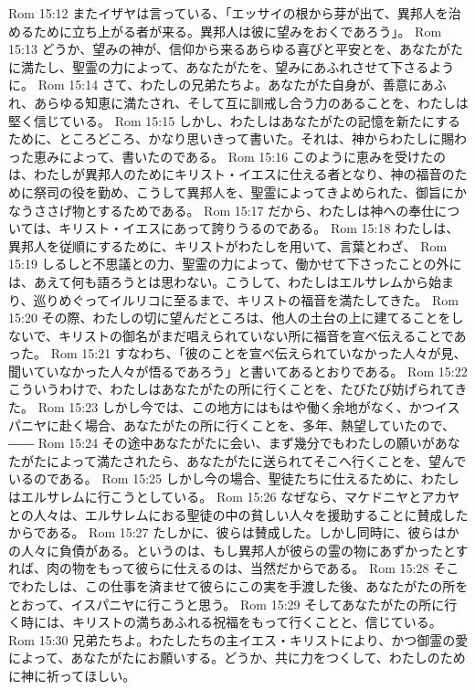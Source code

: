 Rom 15:12  またイザヤは言っている、「エッサイの根から芽が出て、異邦人を治めるために立ち上がる者が来る。異邦人は彼に望みをおくであろう」。
Rom 15:13  どうか、望みの神が、信仰から来るあらゆる喜びと平安とを、あなたがたに満たし、聖霊の力によって、あなたがたを、望みにあふれさせて下さるように。
Rom 15:14  さて、わたしの兄弟たちよ。あなたがた自身が、善意にあふれ、あらゆる知恵に満たされ、そして互に訓戒し合う力のあることを、わたしは堅く信じている。
Rom 15:15  しかし、わたしはあなたがたの記憶を新たにするために、ところどころ、かなり思いきって書いた。それは、神からわたしに賜わった恵みによって、書いたのである。
Rom 15:16  このように恵みを受けたのは、わたしが異邦人のためにキリスト・イエスに仕える者となり、神の福音のために祭司の役を勤め、こうして異邦人を、聖霊によってきよめられた、御旨にかなうささげ物とするためである。
Rom 15:17  だから、わたしは神への奉仕については、キリスト・イエスにあって誇りうるのである。
Rom 15:18  わたしは、異邦人を従順にするために、キリストがわたしを用いて、言葉とわざ、
Rom 15:19  しるしと不思議との力、聖霊の力によって、働かせて下さったことの外には、あえて何も語ろうとは思わない。こうして、わたしはエルサレムから始まり、巡りめぐってイルリコに至るまで、キリストの福音を満たしてきた。
Rom 15:20  その際、わたしの切に望んだところは、他人の土台の上に建てることをしないで、キリストの御名がまだ唱えられていない所に福音を宣べ伝えることであった。
Rom 15:21  すなわち、「彼のことを宣べ伝えられていなかった人々が見、聞いていなかった人々が悟るであろう」と書いてあるとおりである。
Rom 15:22  こういうわけで、わたしはあなたがたの所に行くことを、たびたび妨げられてきた。
Rom 15:23  しかし今では、この地方にはもはや働く余地がなく、かつイスパニヤに赴く場合、あなたがたの所に行くことを、多年、熱望していたので、――
Rom 15:24  その途中あなたがたに会い、まず幾分でもわたしの願いがあなたがたによって満たされたら、あなたがたに送られてそこへ行くことを、望んでいるのである。
Rom 15:25  しかし今の場合、聖徒たちに仕えるために、わたしはエルサレムに行こうとしている。
Rom 15:26  なぜなら、マケドニヤとアカヤとの人々は、エルサレムにおる聖徒の中の貧しい人々を援助することに賛成したからである。
Rom 15:27  たしかに、彼らは賛成した。しかし同時に、彼らはかの人々に負債がある。というのは、もし異邦人が彼らの霊の物にあずかったとすれば、肉の物をもって彼らに仕えるのは、当然だからである。
Rom 15:28  そこでわたしは、この仕事を済ませて彼らにこの実を手渡した後、あなたがたの所をとおって、イスパニヤに行こうと思う。
Rom 15:29  そしてあなたがたの所に行く時には、キリストの満ちあふれる祝福をもって行くことと、信じている。
Rom 15:30  兄弟たちよ。わたしたちの主イエス・キリストにより、かつ御霊の愛によって、あなたがたにお願いする。どうか、共に力をつくして、わたしのために神に祈ってほしい。
